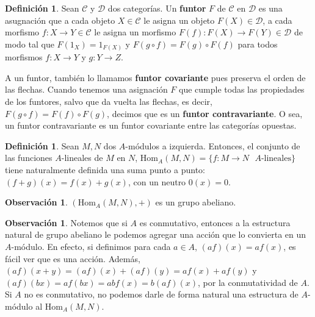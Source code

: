 \documentclass[12pt]{book}
\theoremstyle{definition}
\newtheorem{obs}[teo]{Observación}
\newtheorem{defn}[teo]{Definición}
\renewcommand{\hom}{\mathrm{Hom}}
\begin{document}
\begin{defn}
Sean $\mathcal{C}$ y $\mathcal{D}$ dos categorías. Un \textbf{funtor} $F$ de $\mathcal{C}$ en $\mathcal{D}$ es una asugnación que a cada objeto $X\in\mathcal{C}$ le asigna un objeto $F(X)\in\mathcal{D}$, a cada morfismo $f:X\to Y\in\mathcal{C}$ le asigna un morfismo $F(f):F(X)\to F(Y)\in\mathcal{D}$ de modo tal que $F(1_X)=1_{F(X)}$ y $F(g\circ f)=F(g)\circ F(f)$ para todos morfismos $f:X\to Y$ y $g:Y\to Z$.

A un funtor, también lo llamamos \textbf{funtor covariante} pues preserva el orden de las flechas. Cuando tenemos una asignación $F$ que cumple todas las propiedades de los funtores, salvo que da vuelta las flechas, es decir, $F(g\circ f)=F(f)\circ F(g)$, decimos que es un \textbf{funtor contravariante}. O sea, un funtor contravariante es un funtor covariante entre las categorías opuestas.

\end{defn}

\begin{defn}
Sean $M,N$ dos $A$-módulos a izquierda. Entonces, el conjunto de las funciones $A$-lineales de $M$ en $N$, $\hom_A(M,N)=\{f:M\to N \text{ } A\text{-lineales}\}$ tiene naturalmente definida una suma punto a punto: $(f+g)(x) = f(x)+g(x)$, con un neutro $0(x)=0$.
\end{defn}

\begin{obs}
$(\hom_A(M,N),+)$ es un grupo abeliano.
\end{obs}

\begin{obs}
Notemos que si $A$ es conmutativo, entonces a la estructura natural de grupo abeliano le podemos agregar una acción que lo convierta en un $A$-módulo. En efecto, si definimos para cada $a\in A$, $(af)(x)= af(x)$, es fácil ver que es una acción. Además, $(af)(x+y) = (af)(x)+(af)(y) = af(x)+af(y)$ y $(af)(bx) = af(bx) = abf(x) = b(af)(x)$, por la conmutatividad de $A$. Si $A$ no es conmutativo, no podemos darle de forma natural una estructura de $A$-módulo al $\hom_A(M,N)$.
\end{obs}
\end{document}
